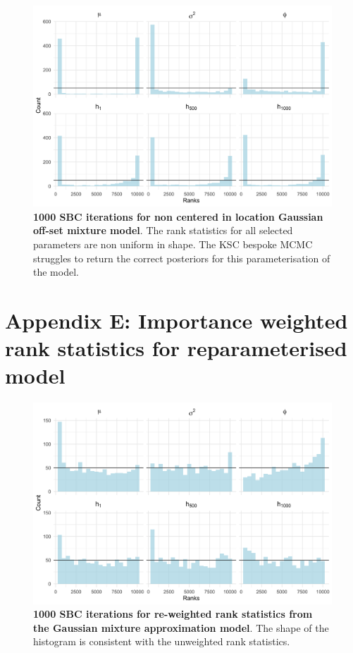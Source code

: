 \documentclass[12pt, a4paper]{article}
\begin{document}
    \begin{figure}[H]
        \centering
        \includegraphics[scale=0.09]{results/ksc_ncp_1k.png}
        \caption{\textbf{1000 SBC iterations for non centered in location Gaussian off-set mixture model}. The rank statistics for all selected parameters are non uniform in shape. The KSC bespoke MCMC struggles to return the correct posteriors for this parameterisation of the model.}
        \label{fig:ncpksc1k}
    \end{figure}
    
\section{Appendix E: Importance weighted rank statistics for reparameterised model}

\begin{figure}[H]
        \centering
        \includegraphics[scale=0.09]{results/weighted_ksc_cp_1k.png}
        \caption{\textbf{1000 SBC iterations for re-weighted rank statistics from the Gaussian mixture approximation model}. The shape of the histogram is consistent with the unweighted rank statistics.}
        \label{fig:reweight1k}
    \end{figure}
\end{document}
